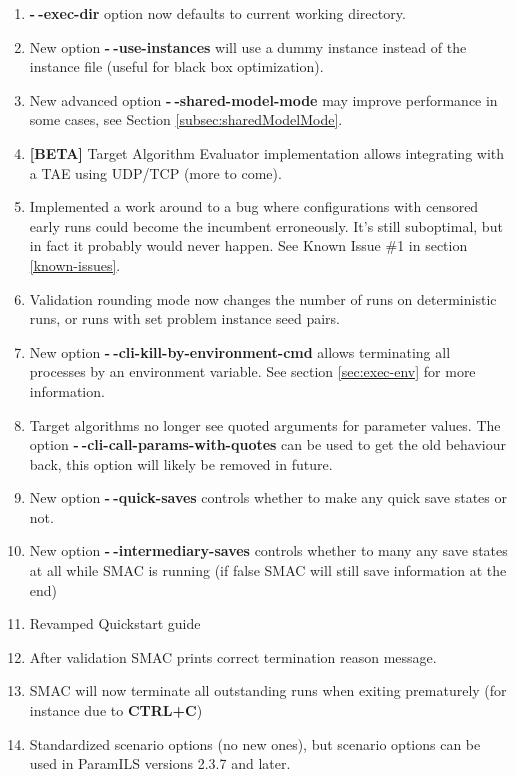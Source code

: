 \documentclass[11pt,letterpaper,oneside]{article}
\begin{document}
\begin{description}
\begin{enumerate}
          		\item \textbf{-$~\!$-exec-dir} option now defaults to current working directory.
          		\item New option \textbf{-$~\!$-use-instances} will use a dummy instance instead of the instance file (useful for black box optimization).
          		\item New advanced option \textbf{-$~\!$-shared-model-mode} may improve performance in some cases, see Section \ref{subsec:sharedModelMode}.
          		\item \textbf{[BETA]} Target Algorithm Evaluator implementation allows integrating with a TAE using UDP/TCP (more to come).
          		\item Implemented a work around to a bug where configurations with censored early runs could become the incumbent erroneously. It's still suboptimal, but in fact it probably would never happen. See Known Issue \#1 in section \ref{known-issues}.
          		\item Validation rounding mode now changes the number of runs on deterministic runs, or runs with set problem instance seed pairs.
          		\item New option \textbf{-$~\!$-cli-kill-by-environment-cmd} allows terminating all processes by an environment variable. See section \ref{sec:exec-env} for more information.
          		\item Target algorithms no longer see quoted arguments for parameter values. The option \textbf{-$~\!$-cli-call-params-with-quotes} can be used to get the old behaviour back, this option will likely be removed in future.
          		\item New option \textbf{-$~\!$-quick-saves} controls whether to make any quick save states or not.
          		\item New option \textbf{-$~\!$-intermediary-saves} controls whether to many any save states at all while SMAC is running (if false SMAC will still save information at the end)
          		\item Revamped Quickstart guide
          		\item After validation SMAC prints correct termination reason message.
          		\item SMAC will now terminate all outstanding runs when exiting prematurely (for instance due to \textbf{CTRL+C})
          		\item Standardized scenario options (no new ones), but scenario options can be used in ParamILS versions 2.3.7 and later.
          		

\end{enumerate}
\end{description}
\end{document}
